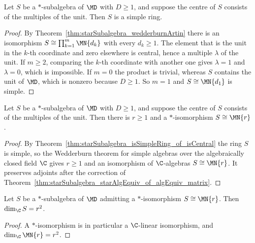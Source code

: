 \begin{theorem}%
    \label{thm:starSubalgebra_isSimpleRing_of_isCentral}
    \leanok
    Let $S$ be a $*$-subalgebra of $\MD$ with $D\geq1$, and suppose the centre
    of $S$ consists of the multiples of the unit. Then $S$ is a simple ring.
\end{theorem}

\begin{proof}
    \leanok
    By Theorem~\ref{thm:starSubalgebra_wedderburnArtin} there is an
    isomorphism $S\cong\prod_{k=1}^{m}\MN{d_k}$ with every $d_k\geq1$. The
    element that is the unit in the $k$-th coordinate and zero elsewhere is
    central, hence a multiple $\lambda$ of the unit. If $m\geq2$, comparing
    the $k$-th coordinate with another one gives $\lambda=1$ and $\lambda=0$,
    which is impossible. If $m=0$ the product is trivial, whereas $S$ contains
    the unit of $\MD$, which is nonzero because $D\geq1$. So $m=1$ and
    $S\cong\MN{d_1}$ is simple.
\end{proof}

\begin{theorem}%
    \label{thm:starSubalgebra_starAlgEquiv_matrix_of_isCentral}
    \leanok
    Let $S$ be a $*$-subalgebra of $\MD$ with $D\geq1$, and suppose the centre
    of $S$ consists of the multiples of the unit. Then there is $r\geq1$ and a
    $*$-isomorphism $S\cong\MN{r}$.
\end{theorem}

\begin{proof}
    \leanok
    By Theorem~\ref{thm:starSubalgebra_isSimpleRing_of_isCentral} the ring $S$
    is simple, so the Wedderburn theorem for simple algebras over the
    algebraically closed field $\C$ gives $r\geq1$ and an isomorphism of
    $\C$-algebras $S\cong\MN{r}$. It preserves adjoints after the correction
    of Theorem~\ref{thm:starSubalgebra_starAlgEquiv_of_algEquiv_matrix}.
\end{proof}

\begin{lemma}%
    \label{lem:starSubalgebra_finrank_matrix_presentation}
    \leanok
    Let $S$ be a $*$-subalgebra of $\MD$ admitting a $*$-isomorphism
    $S\cong\MN{r}$. Then $\dim_{\C}S=r^2$.
\end{lemma}

\begin{proof}
    \leanok
    A $*$-isomorphism is in particular a $\C$-linear isomorphism, and
    $\dim_{\C}\MN{r}=r^2$.
\end{proof}
